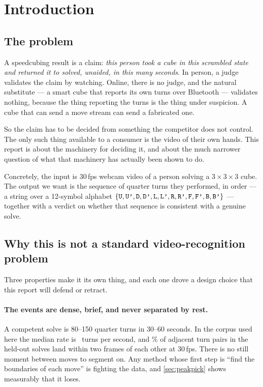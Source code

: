 \section{Introduction}
\label{sec:intro}

\subsection{The problem}

A speedcubing result is a claim: \emph{this person took a cube in this
scrambled state and returned it to solved, unaided, in this many seconds}.
In person, a judge validates the claim by watching. Online, there is no
judge, and the natural substitute --- a smart cube that reports its own
turns over Bluetooth --- validates nothing, because the thing reporting the
turns is the thing under suspicion. A cube that can send a move stream can
send a fabricated one.

So the claim has to be decided from something the competitor does not
control. The only such thing available to a consumer is the video of their
own hands. This report is about the machinery for deciding it, and about the
much narrower question of what that machinery has actually been shown to do.

Concretely, the input is 30\,fps webcam video of a person solving a
$3\times3\times3$ cube. The output we want is the sequence of quarter turns
they performed, in order --- a string over a 12-symbol alphabet
$\{\texttt{U},\texttt{U'},\texttt{D},\texttt{D'},\texttt{L},\texttt{L'},\texttt{R},\texttt{R'},
\texttt{F},\texttt{F'},\texttt{B},\texttt{B'}\}$ --- together with a verdict on whether
that sequence is consistent with a genuine solve.

\subsection{Why this is not a standard video-recognition problem}

Three properties make it its own thing, and each one drove a design choice
that this report will defend or retract.

\paragraph{The events are dense, brief, and never separated by rest.}
A competent solve is 80--150 quarter turns in 30--60 seconds. In the corpus
used here the median rate is \MedianTPS\ turns per second, and
\CrowdedPctHoldout\% of adjacent turn pairs in the held-out solves land
within two frames of each other at 30\,fps. There is no still moment between
moves to segment on. Any method whose first step is ``find the boundaries of
each move'' is fighting the data, and \cref{sec:peakpick} shows measurably
that it loses.

